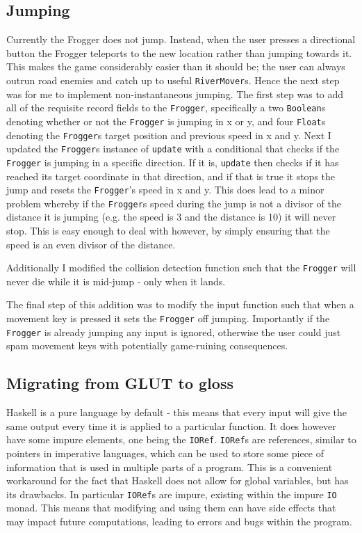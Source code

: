 \documentclass[12pt, a4paper]{report}
\begin{document}
\subsection{Jumping}

Currently the Frogger does not jump.
Instead, when the user presses a directional button the Frogger teleports to the new location rather than jumping towards it.
This makes the game considerably easier than it should be; the user can always outrun road enemies and catch up to useful \verb|RiverMover|s.
Hence the next step was for me to implement non-instantaneous jumping.
The first step was to add all of the requisite record fields to the \verb|Frogger|, specifically a two \verb|Boolean|s denoting whether or not the \verb|Frogger| is jumping in x or y, and four \verb|Float|s denoting the \verb|Frogger|s target position and previous speed in x and y.
Next I updated the \verb|Frogger|s instance of \verb|update| with a conditional that checks if the \verb|Frogger| is jumping in a specific direction.
If it is, \verb|update| then checks if it has reached its target coordinate in that direction, and if that is true it stops the jump and resets the \verb|Frogger|'s speed in x and y.
This does lead to a minor problem whereby if the \verb|Frogger|s speed during the jump is not a divisor of the distance it is jumping (e.g. the speed is 3 and the distance is 10) it will never stop.
This is easy enough to deal with however, by simply ensuring that the speed is an even divisor of the distance.

\par

Additionally I modified the collision detection function such that the \verb|Frogger| will never die while it is mid-jump - only when it lands.

\par

The final step of this addition was to modify the input function such that when a movement key is pressed it sets the \verb|Frogger| off jumping.
Importantly if the \verb|Frogger| is already jumping any input is ignored, otherwise the user could just spam movement keys with potentially game-ruining consequences.

\subsection{Migrating from GLUT to gloss}

Haskell is a pure language by default - this means that every input will give the same output every time it is applied to a particular function.
It does however have some impure elements, one being the \verb|IORef|.
\verb|IORef|s are references, similar to pointers in imperative languages, which can be used to store some piece of information that is used in multiple parts of a program\cite{iorefs}.
This is a convenient workaround for the fact that Haskell does not allow for global variables, but has its drawbacks.
In particular \verb|IORef|s are impure, existing within the impure \verb|IO| monad.
This means that modifying and using them can have side effects that may impact future computations, leading to errors and bugs within the program.
\end{document}

